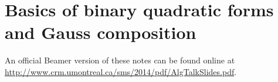 
\section{Basics of binary quadratic forms and Gauss composition}

An official Beamer version of these notes can be found online at 
\url{http://www.crm.umontreal.ca/sms/2014/pdf/AlgTalkSlides.pdf}. 




